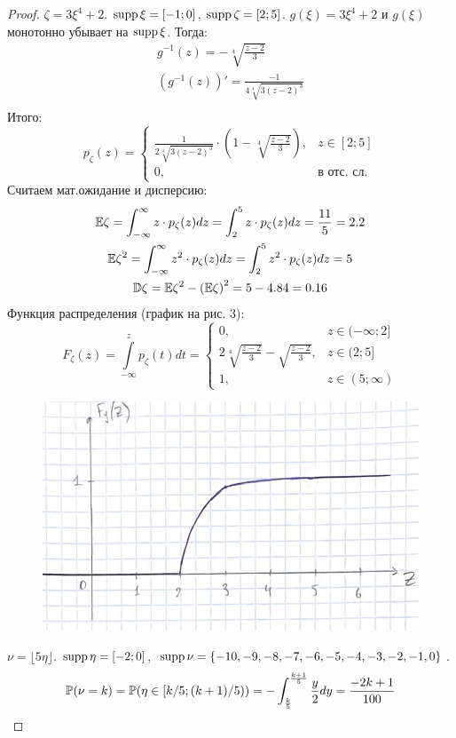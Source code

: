 \begin{proof}
$\zeta = 3\xi^4 + 2$. $\operatorname{\mathop{supp}}\xi = [-1;0]$, $\operatorname{\mathop{supp}}\zeta = [2;5]$. $g(\xi) = 3\xi^4 + 2$ и $g(\xi)$ монотонно убывает на $\operatorname{\mathop{supp}}\xi$. Тогда:
\begin{gather*}
g^{-1}(z) = -\sqrt[4]{\frac{z - 2}{3}}\\
(g^{-1}(z))' = \frac{-1}{4\sqrt[4]{3(z - 2)^3}}\\
\end{gather*}
Итого:
\[
p_{\zeta}(z) = \begin{cases}
    \frac{1}{2\sqrt[4]{3(z - 2)^3}}\cdot\left(1 - \sqrt[4]{\frac{z - 2}{3}}\right), & z \in [2;5]\\
    0, & \text{в отс. сл.}
    \end{cases}
\]
Считаем мат.ожидание и дисперсию:
\begin{gather*}
    \mathbb E\zeta = \int_{-\infty}^{\infty}z\cdot p_{\zeta}(z)dz = \int_{2}^{5}z\cdot p_{\zeta}(z)dz = \frac{11}{5} = 2.2\\
    \mathbb E\zeta^2 = \int_{-\infty}^{\infty}z^2\cdot p_{\zeta}(z)dz = \int_{2}^{5}z^2\cdot p_{\zeta}(z)dz = 5\\
    \mathbb D\zeta = \mathbb E\zeta^2 - \left(\mathbb E\zeta\right)^2 = 5 - 4.84 = 0.16
\end{gather*}
Функция распределения (график на рис. 3):
\[
F_{\zeta}(z) = \int\limits_{-\infty}^{z}p_{\zeta}(t)dt = \begin{cases}
    0, & z\in (-\infty;2]\\
    2\sqrt[4]{\frac{z - 2}{3}} - \sqrt{\frac{z - 2}{3}}, & z\in (2; 5]\\
    1, & z\in (5;\infty)
\end{cases}
\]
\begin{figure}[h!]
    \centering
    \includegraphics[width=0.5\linewidth]{3.jpeg}
    \caption{}
    \label{fig:enter-label}
\end{figure}
$\nu = \lfloor5\eta\rfloor$. $\operatorname{\mathop{supp}}\eta = [-2;0]$, $\operatorname{\mathop{supp}}\nu = \{-10, -9, -8, -7, -6, -5, -4, -3, -2, -1, 0\}$.
\[
\mathbb P(\nu = k) = \mathbb P(\eta\in[k/5; (k + 1)/5)) = -\int_{\frac{k}{5}}^{\frac{k + 1}{5}}\frac{y}{2}dy = \frac{-2k + 1}{100}
\]
\end{proof}
